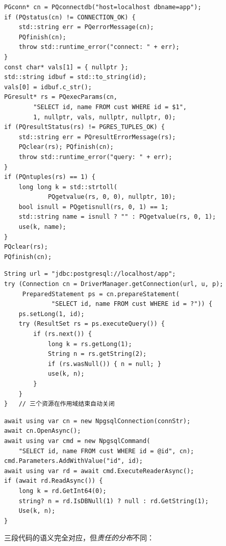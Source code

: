 \documentclass[12pt,a4paper,fontset=fandol]{ctexbook}
\begin{document}
\begin{lstlisting}[caption={C/C++：libpq 的一条参数化查询}]
PGconn* cn = PQconnectdb("host=localhost dbname=app");
if (PQstatus(cn) != CONNECTION_OK) {
    std::string err = PQerrorMessage(cn);
    PQfinish(cn);
    throw std::runtime_error("connect: " + err);
}
const char* vals[1] = { nullptr };
std::string idbuf = std::to_string(id);
vals[0] = idbuf.c_str();
PGresult* rs = PQexecParams(cn,
        "SELECT id, name FROM cust WHERE id = $1",
        1, nullptr, vals, nullptr, nullptr, 0);
if (PQresultStatus(rs) != PGRES_TUPLES_OK) {
    std::string err = PQresultErrorMessage(rs);
    PQclear(rs); PQfinish(cn);
    throw std::runtime_error("query: " + err);
}
if (PQntuples(rs) == 1) {
    long long k = std::strtoll(
            PQgetvalue(rs, 0, 0), nullptr, 10);
    bool isnull = PQgetisnull(rs, 0, 1) == 1;
    std::string name = isnull ? "" : PQgetvalue(rs, 0, 1);
    use(k, name);
}
PQclear(rs);
PQfinish(cn);
\end{lstlisting}

\begin{lstlisting}[style=javastyle,caption={Java：同一条查询的 JDBC 写法}]
String url = "jdbc:postgresql://localhost/app";
try (Connection cn = DriverManager.getConnection(url, u, p);
     PreparedStatement ps = cn.prepareStatement(
             "SELECT id, name FROM cust WHERE id = ?")) {
    ps.setLong(1, id);
    try (ResultSet rs = ps.executeQuery()) {
        if (rs.next()) {
            long k = rs.getLong(1);
            String n = rs.getString(2);
            if (rs.wasNull()) { n = null; }
            use(k, n);
        }
    }
}   // 三个资源在作用域结束自动关闭
\end{lstlisting}

\begin{lstlisting}[style=csharpstyle,caption={C\#：同一条查询的 ADO.NET 写法}]
await using var cn = new NpgsqlConnection(connStr);
await cn.OpenAsync();
await using var cmd = new NpgsqlCommand(
    "SELECT id, name FROM cust WHERE id = @id", cn);
cmd.Parameters.AddWithValue("id", id);
await using var rd = await cmd.ExecuteReaderAsync();
if (await rd.ReadAsync()) {
    long k = rd.GetInt64(0);
    string? n = rd.IsDBNull(1) ? null : rd.GetString(1);
    Use(k, n);
}
\end{lstlisting}

三段代码的语义完全对应，但\emph{责任的分布}不同：
\end{document}
